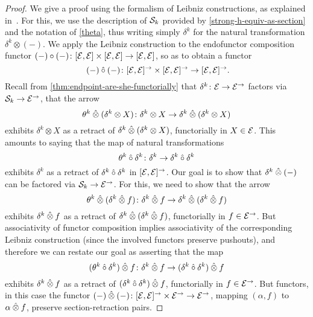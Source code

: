 \documentclass[reqno,10pt,a4paper,oneside,draft]{amsart}
\begin{document}
{{\begin{proof} We give a proof using the formalism of Leibniz constructions, as explained in~\cite{riehl-verity:reedy}.
For this, we use the description of $\cal{S}_k$ provided by \cref{strong-h-equiv-as-section} and the notation of \cref{theta}, 
thus writing simply $\delta^k$ for the natural transformation $\delta^k \otimes (-)$.
We apply the Leibniz construction to the endofunctor composition functor
$(-) \cc (-) \co [\cal{E}, \cal{E}] \times [\cal{E}, \cal{E}] \to [\cal{E}, \cal{E}]$, so as to obtain a functor
\[
(-) \mathbin{\hat{\cc}} (-) \co [\cal{E}, \cal{E}]^\to \times [\cal{E}, \cal{E}]^\to \to [\cal{E}, \cal{E}]^\to \rlap{.}
\]
Recall from \cref{thm:endpoint-are-she-functorially} that $\delta^k \co \cal{E} \to \cal{E}^\to$ factors via $\cal{S}_k \to \cal{E}^\to$, \ie that
the arrow 
\[
  \theta^k \hatotimes (\delta^k \otimes X) \co \delta^k \otimes X \to \delta^k \hatotimes (\delta^k \otimes X)
\]
exhibits $\delta^k \otimes X$ as a retract of $\delta^k \hatotimes (\delta^k \otimes X)$, functorially in $X \in \cal{E}$.
This amounts to saying that the map of natural transformations
\[
  \theta^k \mathbin{\hat{\cc}} \delta^k \co \delta^k \to \delta^k \mathbin{\hat{\cc}} \delta^k 
\]
exhibits $\delta^k$ as a retract of $\delta^k \mathbin{\hat{\cc}} \delta^k$ in $[\cal{E},\cal{E}]^\to$. 
Our goal is to show that $\delta^k \hatotimes (-)$ can be factored via $\cal{S}_k \to \cal{E}^\to$. For this, we need to show
that the arrow 
\[
  \theta^k \hatotimes (\delta^k \hatotimes f) \co \delta^k \hatotimes f \to \delta^k \hatotimes (\delta^k \hatotimes f)
\]
exhibits $\delta^k \hatotimes f$ as a retract of $\delta^k \hatotimes (\delta^k \hatotimes f)$, functorially in $f \in \cal{E}^\to$. 
But associativity of functor composition implies associativity of the corresponding Leibniz construction (since the involved functors preserve pushouts), and therefore we can restate our goal as asserting that the map 
\[
  (\theta^k \mathbin{\hat{\cc}} \delta^k) \hatotimes f 
   \co
  \delta^k \hatotimes f
   \to  
    (\delta^k \mathbin{\hat{\cc}} \delta^k) \hatotimes f 
    \]
exhibits $\delta^k \hatotimes f$ as a retract of $(\delta^k \mathbin{\hat{\cc}} \delta^k) \hatotimes f$, functorially in $f \in \cal{E}^\to$.  But functors, in this case the functor $(-) \hatotimes (-) \co [\cal{E}, \cal{E}]^\to \times \cal{E}^\to \to \cal{E}^\to$, 
mapping $(\alpha, f)$ to $\alpha \hatotimes f$, preserve section-retraction pairs.
\end{proof}

}}
\end{document}
